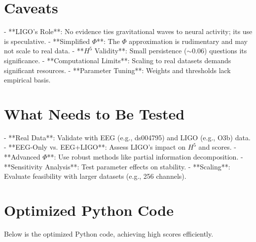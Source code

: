 \documentclass{article}
\begin{document}
\section{Caveats}

- **LIGO’s Role**: No evidence ties gravitational waves to neural activity; its use is speculative.
- **Simplified \(\Phi\)**: The \(\Phi\) approximation is rudimentary and may not scale to real data.
- **\(H^5\) Validity**: Small persistence (\(\sim 0.06\)) questions its significance.
- **Computational Limits**: Scaling to real datasets demands significant resources.
- **Parameter Tuning**: Weights and thresholds lack empirical basis.

\section{What Needs to Be Tested}

- **Real Data**: Validate with EEG (e.g., ds004795) and LIGO (e.g., O3b) data.
- **EEG-Only vs. EEG+LIGO**: Assess LIGO’s impact on \(H^5\) and scores.
- **Advanced \(\Phi\)**: Use robust methods like partial information decomposition.
- **Sensitivity Analysis**: Test parameter effects on stability.
- **Scaling**: Evaluate feasibility with larger datasets (e.g., 256 channels).

\section{Optimized Python Code}

Below is the optimized Python code, achieving high scores efficiently.
\end{document}
